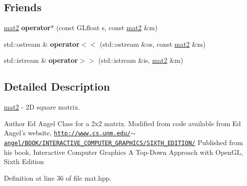 \subsection*{Friends}
\begin{DoxyCompactItemize}
\item 
\hypertarget{class_angel_1_1mat2_a93186aa02a28897515079acad73bd0dd}{\hyperlink{class_angel_1_1mat2}{mat2} {\bfseries operator$\ast$} (const G\-Lfloat s, const \hyperlink{class_angel_1_1mat2}{mat2} \&m)}\label{class_angel_1_1mat2_a93186aa02a28897515079acad73bd0dd}

\item 
\hypertarget{class_angel_1_1mat2_a264412852cfa06a39b477d08b390d8e8}{std\-::ostream \& {\bfseries operator$<$$<$} (std\-::ostream \&os, const \hyperlink{class_angel_1_1mat2}{mat2} \&m)}\label{class_angel_1_1mat2_a264412852cfa06a39b477d08b390d8e8}

\item 
\hypertarget{class_angel_1_1mat2_a43f4ce08af11ef35f85de6c785b093a8}{std\-::istream \& {\bfseries operator$>$$>$} (std\-::istream \&is, \hyperlink{class_angel_1_1mat2}{mat2} \&m)}\label{class_angel_1_1mat2_a43f4ce08af11ef35f85de6c785b093a8}

\end{DoxyCompactItemize}


\subsection{Detailed Description}
\hyperlink{class_angel_1_1mat2}{mat2} -\/ 2\-D square matrix. 

\begin{DoxyAuthor}{Author}
Ed Angel Class for a 2x2 matrix. Modified from code available from Ed Angel's website, \href{http://www.cs.unm.edu/~angel/BOOK/INTERACTIVE_COMPUTER_GRAPHICS/SIXTH_EDITION/}{\tt http\-://www.\-cs.\-unm.\-edu/$\sim$angel/\-B\-O\-O\-K/\-I\-N\-T\-E\-R\-A\-C\-T\-I\-V\-E\-\_\-\-C\-O\-M\-P\-U\-T\-E\-R\-\_\-\-G\-R\-A\-P\-H\-I\-C\-S/\-S\-I\-X\-T\-H\-\_\-\-E\-D\-I\-T\-I\-O\-N/} Published from his book, Interactive Computer Graphics A Top-\/\-Down Approach with Open\-G\-L, Sixth Edition 
\end{DoxyAuthor}


Definition at line 36 of file mat.\-hpp.



